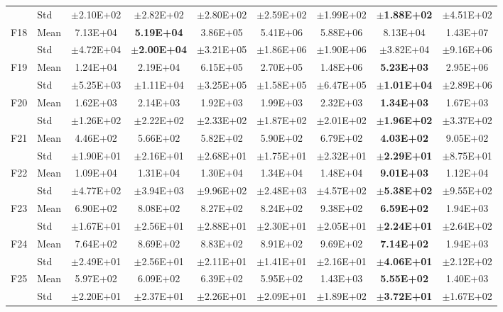 \begin{table}[htbp]
{\begin{tabular}{clccccccc}
 & Std & $\pm$2.10E+02 & $\pm$2.82E+02 & $\pm$2.80E+02 & $\pm$2.59E+02 & $\pm$1.99E+02 & $\pm$\textbf{1.88E+02} & $\pm$4.51E+02 \\
F18 & Mean & 7.13E+04 & \textbf{5.19E+04} & 3.86E+05 & 5.41E+06 & 5.88E+06 & 8.13E+04 & 1.43E+07 \\
 & Std & $\pm$4.72E+04 & $\pm$\textbf{2.00E+04} & $\pm$3.21E+05 & $\pm$1.86E+06 & $\pm$1.90E+06 & $\pm$3.82E+04 & $\pm$9.16E+06 \\
F19 & Mean & 1.24E+04 & 2.19E+04 & 6.15E+05 & 2.70E+05 & 1.48E+06 & \textbf{5.23E+03} & 2.95E+06 \\
 & Std & $\pm$5.25E+03 & $\pm$1.11E+04 & $\pm$3.25E+05 & $\pm$1.58E+05 & $\pm$6.47E+05 & $\pm$\textbf{1.01E+04} & $\pm$2.89E+06 \\
F20 & Mean & 1.62E+03 & 2.14E+03 & 1.92E+03 & 1.99E+03 & 2.32E+03 & \textbf{1.34E+03} & 1.67E+03 \\
 & Std & $\pm$1.26E+02 & $\pm$2.22E+02 & $\pm$2.33E+02 & $\pm$1.87E+02 & $\pm$2.01E+02 & $\pm$\textbf{1.96E+02} & $\pm$3.37E+02 \\
F21 & Mean & 4.46E+02 & 5.66E+02 & 5.82E+02 & 5.90E+02 & 6.79E+02 & \textbf{4.03E+02} & 9.05E+02 \\
 & Std & $\pm$1.90E+01 & $\pm$2.16E+01 & $\pm$2.68E+01 & $\pm$1.75E+01 & $\pm$2.32E+01 & $\pm$\textbf{2.29E+01} & $\pm$8.75E+01 \\
F22 & Mean & 1.09E+04 & 1.31E+04 & 1.30E+04 & 1.34E+04 & 1.48E+04 & \textbf{9.01E+03} & 1.12E+04 \\
 & Std & $\pm$4.77E+02 & $\pm$3.94E+03 & $\pm$9.96E+02 & $\pm$2.48E+03 & $\pm$4.57E+02 & $\pm$\textbf{5.38E+02} & $\pm$9.55E+02 \\
F23 & Mean & 6.90E+02 & 8.08E+02 & 8.27E+02 & 8.24E+02 & 9.38E+02 & \textbf{6.59E+02} & 1.94E+03 \\
 & Std & $\pm$1.67E+01 & $\pm$2.56E+01 & $\pm$2.88E+01 & $\pm$2.30E+01 & $\pm$2.05E+01 & $\pm$\textbf{2.24E+01} & $\pm$2.64E+02 \\
F24 & Mean & 7.64E+02 & 8.69E+02 & 8.83E+02 & 8.91E+02 & 9.69E+02 & \textbf{7.14E+02} & 1.94E+03 \\
 & Std & $\pm$2.49E+01 & $\pm$2.56E+01 & $\pm$2.11E+01 & $\pm$1.41E+01 & $\pm$2.16E+01 & $\pm$\textbf{4.06E+01} & $\pm$2.12E+02 \\
F25 & Mean & 5.97E+02 & 6.09E+02 & 6.39E+02 & 5.95E+02 & 1.43E+03 & \textbf{5.55E+02} & 1.40E+03 \\
 & Std & $\pm$2.20E+01 & $\pm$2.37E+01 & $\pm$2.26E+01 & $\pm$2.09E+01 & $\pm$1.89E+02 & $\pm$\textbf{3.72E+01} & $\pm$1.67E+02 \\

\end{tabular}}
\end{table}

